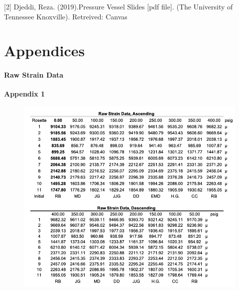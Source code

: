 \documentclass[12pt]{article}
\begin{document}
[2] Djeddi, Reza. (2019).Pressure Vessel Slides [pdf file]. (The University of Tennessee Knoxville). Retreived: Canvas 

\newpage
\section {Appendices}
\paragraph{Raw Strain Data}
\textbf{Appendix 1}
\begin{figure}[H]
	\centering
	\includegraphics [width=1.0\textwidth]{appendix_rawdata}
\end{figure} 

\newpage
\end{document}
